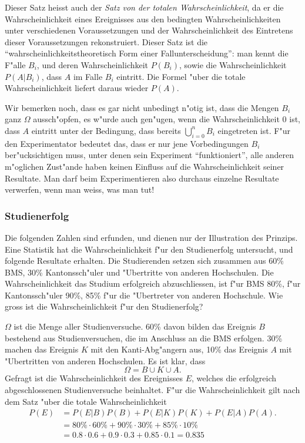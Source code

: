 Dieser Satz heisst auch der {\em Satz von der totalen Wahrscheinlichkeit},
da er die Wahrscheinlichkeit eines Ereignisses aus den bedingten
Wahrscheinlichkeiten unter verschiedenen Voraussetzungen und der
Wahrscheinlichkeit des Eintretens dieser Voraussetzungen rekonstruiert.
Dieser Satz ist die ``wahrscheinlichkeitstheoretisch Form einer
Fallunterscheidung'': man kennt die F"alle $B_i$, und deren Wahrscheinlichkeit
$P(B_i)$, sowie die Wahrscheinlichkeit $P(A|B_i)$, dass $A$ im Falle 
$B_i$ eintritt.
Die Formel "uber die totale Wahrscheinlichkeit
liefert daraus wieder $P(A)$.

Wir bemerken noch, dass es gar nicht unbedingt n"otig ist, dass die Mengen
$B_i$ ganz $\Omega$ aussch"opfen, es w"urde auch
gen"ugen, wenn die Wahrscheinlichkeit $0$ ist, dass $A$ eintritt
unter der Bedingung,
dass bereits $\bigcup_{i=0}^{n}B_i$ eingetreten ist.
F"ur den
Experimentator bedeutet das, dass er nur jene Vorbedingungen $B_i$
ber"ucksichtigen muss, unter denen sein Experiment ``funktioniert'',
alle anderen m"oglichen Zust"ande haben keinen Einfluss auf
die Wahrscheinlichkeit seiner Resultate.
Man darf beim Experimentieren also durchaus einzelne Resultate
verwerfen, wenn man weiss, was man tut!

\subsubsection{Studienerfolg}
Die folgenden Zahlen sind erfunden, und dienen nur der Illustration
des Prinzips.
Eine Statistik hat die Wahrscheinlichkeit f"ur den
Studienerfolg untersucht, und folgende Resultate erhalten.
Die Studierenden setzen sich zusammen aus 60\% BMS, 30\% Kantonssch"uler
und "Ubertritte von anderen Hochschulen.
Die Wahrscheinlichkeit
das Studium erfolgreich abzuschliessen, ist f"ur BMS 80\%,
f"ur Kantonssch"uler 90\%, 85\% f"ur die "Ubertreter von anderen
Hochschule.
Wie gross ist die Wahrscheinlichkeit f"ur den Studienerfolg?

$\Omega$ ist die Menge aller Studienversuche.
60\% davon bilden das
Ereignis $B$ bestehend aus Studienversuchen, die im Anschluss an die BMS
erfolgen.
30\% machen das Ereignis $K$ mit den Kanti-Abg"angern aus,
10\% das Ereignis $A$ mit "Ubertritten von anderen Hochschulen.
Es ist klar, dass 
\[
\Omega = B \cup K\cup A.
\]
Gefragt ist die Wahrscheinlichkeit des Ereignisses $E$, welches
die erfolgreich abgeschlossenen Studienversuche beinhaltet.
F"ur die Wahrscheinlichkeit gilt nach dem Satz "uber die totale
Wahrscheinlichkeit
\begin{align*}
P(E)&=P(E|B)P(B)+P(E|K)P(K)+P(E|A)P(A).
\\
    &= 80\%\cdot 60\%
     + 90\%\cdot 30\%
     + 85\%\cdot 10\%
\\
&=0.8\cdot 0.6 + 0.9 \cdot 0.3 + 0.85 \cdot 0.1 = 0.835
\end{align*}


